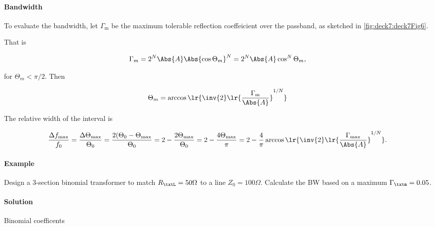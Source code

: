 \paragraph{Bandwidth}

To evaluate the bandwidth, let \( \Gamma_{\mathrm{m}} \) be the maximum tolerable reflection coeffeicient over the passband, as sketched in \cref{fig:deck7:deck7Fig6}.


That is

\begin{dmath}\label{eqn:uwavesDeck7MultisectionTransformersCore:400}
\Gamma_m 
= 2^N \Abs{A} \Abs{\cos \Theta_m }^N 
= 2^N \Abs{A} \cos^N \Theta_m,
\end{dmath}

for \( \Theta_m < \pi/2 \).  Then

\begin{dmath}\label{eqn:uwavesDeck7MultisectionTransformersCore:420}
\Theta_m = \arccos\lr{ \inv{2} \lr{ \frac{\Gamma_{\mathrm{m}}}{\Abs{A}}}^{1/N} }
\end{dmath}

The relative width of the interval is

\begin{dmath}\label{eqn:uwavesDeck7MultisectionTransformersCore:440}
\frac{\Delta f_{\mathrm{max}}}{f_0}
=
\frac{\Delta \Theta_{\mathrm{max}}}{\Theta_0}
=
\frac{2 (\Theta_0 - \Theta_{\mathrm{max}}}{\Theta_0}
=
2 - \frac{2 \Theta_{\mathrm{max}}}{\Theta_0}
=
2 - \frac{4 \Theta_{\mathrm{max}}}{\pi}
=
2 - \frac{4 }{\pi} \arccos\lr{ \inv{2} \lr{ \frac{\Gamma_{\mathrm{max}}}{\Abs{A}}}^{1/N} }.
\end{dmath}

\paragraph{Example}

Design a 3-section binomial transformer to match \( R_\txtL = 50 \Omega \) to a line \( Z_0 = 100 \Omega \).  Calculate the BW based on a maximum \( \Gamma_\txtm = 0.05 \).

\paragraph{Solution}

Binomial coefficents

